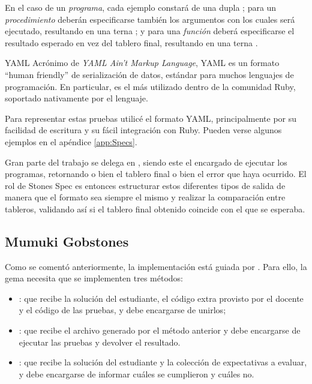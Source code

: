 En el caso de un \emph{programa}, cada ejemplo constará de una dupla ; para un \emph{procedimiento} deberán especificarse también los argumentos con los cuales será ejecutado, resultando en una terna ; y para una \emph{función} deberá especificarse el resultado esperado en vez del tablero final, resultando en una terna .

\sepfootnotecontent
  {YAML}
  {Acrónimo de \emph{YAML Ain't Markup Language}, YAML es un formato ``human friendly'' de serialización de datos, estándar para muchos lenguajes de programación. En particular, es el más utilizado dentro de la comunidad Ruby, soportado nativamente por el lenguaje.}

Para representar estas pruebas utilicé el formato YAML, principalmente por su facilidad de escritura y su fácil integración con Ruby. Pueden verse algunos ejemplos en el apéndice \ref{app:Specs}.

Gran parte del trabajo se delega en \pyGob, siendo este el encargado de ejecutar los programas, retornando o bien el tablero final o bien el error que haya ocurrido. El rol de Stones Spec es entonces estructurar estos diferentes tipos de salida de manera que el formato sea siempre el mismo y realizar la comparación entre tableros, validando así si el tablero final obtenido coincide con el que se esperaba.

\subsection{Mumuki Gobstones \runner}
Como se comentó anteriormente, la implementación está guiada por \mumukit. Para ello, la gema necesita que se implementen tres métodos:
\begin{itemize}
  \item{: que recibe la solución del estudiante, el código extra provisto por el docente y el código de las pruebas, y debe encargarse de unirlos;}
  \item{: que recibe el archivo generado por el método anterior y debe encargarse de ejecutar las pruebas y devolver el resultado.}
  \item{: que recibe la solución del estudiante y la colección de expectativas a evaluar, y debe encargarse de informar cuáles se cumplieron y cuáles no.}
\end{itemize}

